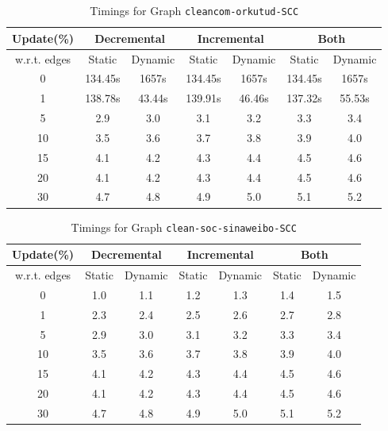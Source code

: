 \begin{table}[H]
    \centering
    \caption{Timings for Graph \texttt{cleancom-orkutud-SCC} }
    \begin{tabular}{|c|c|c|c|c|c|c|}
        \hline
        \textbf{Update(\%)} & \multicolumn{2}{c|}{\textbf{Decremental}} & \multicolumn{2}{c|}{\textbf{Incremental}} & \multicolumn{2}{c|}{\textbf{Both}} \\
        \hline
        w.r.t. edges & Static &  Dynamic & Static & Dynamic & Static & Dynamic \\
        \hline
        0 & 134.45s & 1657s & 134.45s & 1657s & 134.45s & 1657s \\
        1 & 138.78s & 43.44s & 139.91s & 46.46s & 137.32s & 55.53s \\
        5 & 2.9 & 3.0 & 3.1 & 3.2 & 3.3 & 3.4 \\
        10 & 3.5 & 3.6 & 3.7 & 3.8 & 3.9 & 4.0 \\
        15 & 4.1 & 4.2 & 4.3 & 4.4 & 4.5 & 4.6 \\
        20 & 4.1 & 4.2 & 4.3 & 4.4 & 4.5 & 4.6 \\
        30 & 4.7 & 4.8 & 4.9 & 5.0 & 5.1 & 5.2 \\
        \hline
    \end{tabular}
    \label{tab:timed_results_g1}
\end{table}

\begin{table}[H]
    \centering
    \caption{Timings for Graph \texttt{clean-soc-sinaweibo-SCC} }
    \begin{tabular}{|c|c|c|c|c|c|c|}
        \hline
        \textbf{Update(\%)} & \multicolumn{2}{c|}{\textbf{Decremental}} & \multicolumn{2}{c|}{\textbf{Incremental}} & \multicolumn{2}{c|}{\textbf{Both}} \\
        \hline
        w.r.t. edges & Static &  Dynamic & Static & Dynamic & Static & Dynamic \\
        \hline
        0 & 1.0 & 1.1 & 1.2 & 1.3 & 1.4 & 1.5 \\
        1 & 2.3 & 2.4 & 2.5 & 2.6 & 2.7 & 2.8 \\
        5 & 2.9 & 3.0 & 3.1 & 3.2 & 3.3 & 3.4 \\
        10 & 3.5 & 3.6 & 3.7 & 3.8 & 3.9 & 4.0 \\
        15 & 4.1 & 4.2 & 4.3 & 4.4 & 4.5 & 4.6 \\
        20 & 4.1 & 4.2 & 4.3 & 4.4 & 4.5 & 4.6 \\
        30 & 4.7 & 4.8 & 4.9 & 5.0 & 5.1 & 5.2 \\
        \hline
    \end{tabular}
    \label{tab:timed_results_g2}
\end{table}


